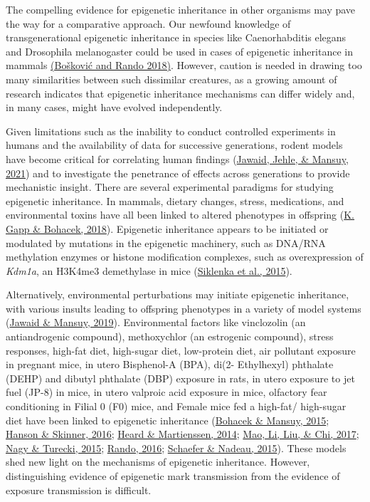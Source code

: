 \documentclass[12pt,twoside]{reedthesis}
\begin{document}
The compelling evidence for epigenetic inheritance in other organisms
may pave the way for a comparative approach. Our newfound knowledge of
transgenerational epigenetic inheritance in species like Caenorhabditis
elegans and Drosophila melanogaster could be used in cases of epigenetic
inheritance in mammals \href{https://sciwheel.com/work/citation?ids=5816737\&pre=\&suf=\&sa=0}{(Bošković and Rando
2018)}.
However, caution is needed in drawing too many similarities between such
dissimilar creatures, as a growing amount of research indicates that
epigenetic inheritance mechanisms can differ widely and, in many cases,
might have evolved independently.

Given limitations such as the inability to conduct controlled
experiments in humans and the availability of data for successive
generations, rodent models have become critical for correlating human
findings (\protect\hyperlink{ref-jawaid2021}{Jawaid, Jehle, \& Mansuy, 2021}) and to investigate the penetrance of effects
across generations to provide mechanistic insight. There are several
experimental paradigms for studying epigenetic inheritance. In mammals,
dietary changes, stress, medications, and environmental toxins have all
been linked to altered phenotypes in offspring (\protect\hyperlink{ref-gapp2018}{K. Gapp \& Bohacek, 2018}). Epigenetic
inheritance appears to be initiated or modulated by mutations in the
epigenetic machinery, such as DNA/RNA methylation enzymes or histone
modification complexes, such as overexpression of \emph{Kdm1a}, an H3K4me3
demethylase in mice (\protect\hyperlink{ref-siklenka2015}{Siklenka et al., 2015}).

Alternatively, environmental perturbations may initiate epigenetic
inheritance, with various insults leading to offspring phenotypes in a
variety of model systems (\protect\hyperlink{ref-jawaid2019}{Jawaid \& Mansuy, 2019}). Environmental factors like
vinclozolin (an antiandrogenic compound), methoxychlor (an estrogenic
compound), stress responses, high-fat diet, high-sugar diet, low-protein
diet, air pollutant exposure in pregnant mice, in utero Bisphenol-A
(BPA), di(2- Ethylhexyl) phthalate (DEHP) and dibutyl phthalate (DBP)
exposure in rats, in utero exposure to jet fuel (JP-8) in mice, in utero
valproic acid exposure in mice, olfactory fear conditioning in Filial 0
(F0) mice, and Female mice fed a high-fat/ high-sugar diet have been
linked to epigenetic inheritance (\protect\hyperlink{ref-bohacek2015}{Bohacek \& Mansuy, 2015}; \protect\hyperlink{ref-hanson2016}{Hanson \& Skinner, 2016}; \protect\hyperlink{ref-heard2014}{Heard \& Martienssen, 2014}; \protect\hyperlink{ref-mao2017}{Mao, Li, Liu, \& Chi, 2017}; \protect\hyperlink{ref-nagy2015}{Nagy \& Turecki, 2015}; \protect\hyperlink{ref-rando2016}{Rando, 2016}; \protect\hyperlink{ref-schaefer2015}{Schaefer \& Nadeau, 2015}). These models shed new
light on the mechanisms of epigenetic inheritance. However,
distinguishing evidence of epigenetic mark transmission from the
evidence of exposure transmission is difficult.
\end{document}
